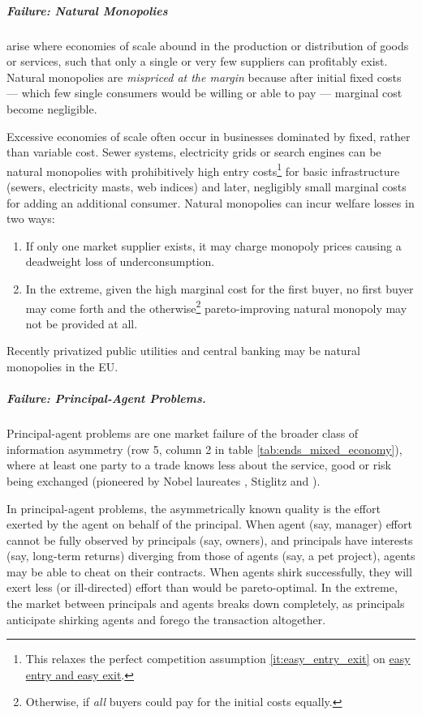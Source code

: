 \subparagraph{Failure: Natural Monopolies}  \label{sec:natural_monopoly} arise where economies of scale abound in the production or distribution of goods or services, such that only a single or very few suppliers can profitably exist. Natural monopolies are \emph{mispriced at the margin} because after initial fixed costs --- which few single consumers would be willing or able to pay --- marginal cost become negligible.

Excessive economies of scale often occur in businesses dominated by fixed, rather than variable cost. Sewer systems, electricity grids or search engines can be natural monopolies with prohibitively high entry costs\footnote{
	This relaxes the perfect competition assumption \ref{it:easy_entry_exit} on \hyperref[it:easy_entry_exit]{easy entry and easy exit}.} 
for basic infrastructure (sewers, electricity masts, web indices) and later, negligibly small marginal costs for adding an additional consumer.  Natural monopolies can incur welfare losses in two ways: 
\begin{enumerate}
	\item If only one market supplier exists, it may charge monopoly prices causing a deadweight loss of underconsumption. 
	\item In the extreme, given the high marginal cost for the first buyer, no first buyer may come forth and the otherwise\footnote{
		Otherwise, if \emph{all} buyers could pay for the initial costs equally.} pareto-improving natural monopoly may not be provided at all.
\end{enumerate} 
Recently privatized public utilities and central banking may be natural monopolies in the \gls{EU}.

\subparagraph[Failure: Principal-Agent Problems]{Failure: Principal-Agent Problems.} \label{sec:principal-agent_problem} 
Principal-agent problems are one market failure of the broader class of information asymmetry (row 5, column 2 in table \ref{tab:ends_mixed_economy}), where at least one party to a trade knows less about the service, good or risk being exchanged (pioneered by Nobel laureates \citealt{Akerlof-1970-aa}, Stiglitz \citeyear{Stiglitz1976} and \citealt{Spence1974}).

In principal-agent problems, the asymmetrically known quality is the effort exerted by the agent on behalf of the principal. When agent (say, manager) effort cannot be fully observed by principals (say, owners), and principals have interests (say, long-term returns) diverging from those of agents (say, a pet project), agents may be able to cheat on their contracts. When agents shirk successfully, they will exert less (or ill-directed) effort than would be pareto-optimal. In the extreme, the market between principals and agents breaks down completely, as principals anticipate shirking agents and forego the transaction altogether. 

